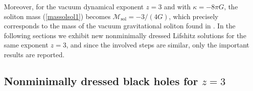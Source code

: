 \documentclass[prd,twocolumn,superscriptaddress,amsmath,amssymb,nofootinbib]{revtex4-1}
\begin{document}
Moreover, for the vacuum dynamical exponent $z=3$ and with
$\kappa=-8 \pi G$, the soliton mass (\ref{massolsol1}) becomes
$\mathcal{M}_{\mathrm{sol}}=-3/(4G)$, which precisely
corresponds to the mass of the vacuum gravitational soliton
found in \cite{Gonzalez:2011nz}. In the following sections we
exhibit new nonminimally dressed Lifshitz solutions for the
same exponent $z=3$, and since the involved steps are similar,
only the important results are reported.


\subsection{\label{family2_3d}Nonminimally dressed black holes for $z=3$}
\end{document}
